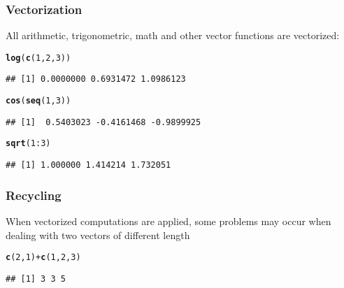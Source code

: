 \documentclass[12pt]{beamer}\usepackage[]{graphicx}\usepackage[]{color}
\makeatletter
\newcommand{\hlnum}[1]{\textcolor[rgb]{0.686,0.059,0.569}{#1}}%
\newcommand{\hlopt}[1]{\textcolor[rgb]{0,0,0}{#1}}%
\newcommand{\hlstd}[1]{\textcolor[rgb]{0.345,0.345,0.345}{#1}}%
\newcommand{\hlkwd}[1]{\textcolor[rgb]{0.737,0.353,0.396}{\textbf{#1}}}%
\newenvironment{kframe}{%
 \def\at@end@of@kframe{}%
 \ifinner\ifhmode%
  \def\at@end@of@kframe{\end{minipage}}%
  \begin{minipage}{\columnwidth}%
 \fi\fi%
 \def\FrameCommand##1{\hskip\@totalleftmargin \hskip-\fboxsep
 \colorbox{shadecolor}{##1}\hskip-\fboxsep
     \hskip-\linewidth \hskip-\@totalleftmargin \hskip\columnwidth}%
 \MakeFramed {\advance\hsize-\width
   \@totalleftmargin\z@ \linewidth\hsize
   \@setminipage}}%
 {\par\unskip\endMakeFramed%
 \at@end@of@kframe}
\newenvironment{knitrout}{}{} %
\makeatother
\begin{document}
\begin{frame}[fragile]
\frametitle{Vectorization}

All arithmetic, trigonometric, math and other vector functions are vectorized:
\begin{knitrout}\footnotesize
{}\color{fgcolor}\begin{kframe}
\begin{alltt}
\hlkwd{log}\hlstd{(}\hlkwd{c}\hlstd{(}\hlnum{1}\hlstd{,} \hlnum{2}\hlstd{,} \hlnum{3}\hlstd{))}
\end{alltt}
\begin{verbatim}
## [1] 0.0000000 0.6931472 1.0986123
\end{verbatim}
\begin{alltt}
\hlkwd{cos}\hlstd{(}\hlkwd{seq}\hlstd{(}\hlnum{1}\hlstd{,} \hlnum{3}\hlstd{))}
\end{alltt}
\begin{verbatim}
## [1]  0.5403023 -0.4161468 -0.9899925
\end{verbatim}
\begin{alltt}
\hlkwd{sqrt}\hlstd{(}\hlnum{1}\hlopt{:}\hlnum{3}\hlstd{)}
\end{alltt}
\begin{verbatim}
## [1] 1.000000 1.414214 1.732051
\end{verbatim}
\end{kframe}
\end{knitrout}

\end{frame}


\begin{frame}[fragile]
\frametitle{Recycling}

When vectorized computations are applied, some problems may occur when dealing with two vectors of different length
\begin{knitrout}\footnotesize
{}\color{fgcolor}\begin{kframe}
\begin{alltt}
\hlkwd{c}\hlstd{(}\hlnum{2}\hlstd{,} \hlnum{1}\hlstd{)} \hlopt{+} \hlkwd{c}\hlstd{(}\hlnum{1}\hlstd{,} \hlnum{2}\hlstd{,} \hlnum{3}\hlstd{)}
\end{alltt}


{\ttfamily\noindent\color{warningcolor}{\#\# Warning in c(2, 1) + c(1, 2, 3): longer object length is not a multiple of shorter object length}}\begin{verbatim}
## [1] 3 3 5
\end{verbatim}
\end{kframe}
\end{knitrout}

\end{frame}
\end{document}

